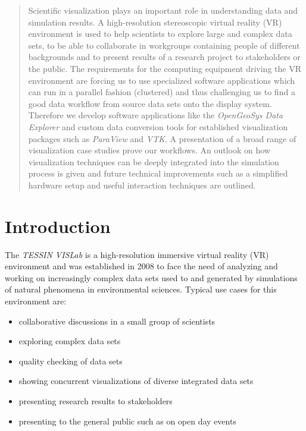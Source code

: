 \begin{abstract}
Scientific visualization plays an important role in understanding data
and simulation results. A high-resolution stereoscopic virtual reality
(VR) environment is used to help scientists to explore large and complex
data sets, to be able to collaborate in workgroups containing people of
different backgrounds and to present results of a research project to
stakeholders or the public. The requirements for the computing equipment
driving the VR environment are forcing us to use specialized
software applications which can run in a parallel fashion (clustered)
and thus challenging us to find a good data workflow from source data
sets onto the display system. Therefore we develop software applications
like the \emph{OpenGeoSys Data Explorer} and custom data conversion tools for
established visualization packages such as \emph{ParaView} and \emph{VTK}. A
presentation of a broad range of visualization case studies prove our
workflows. An outlook on how visualization techniques can be deeply
integrated into the simulation process is given and future technical
improvements such as a simplified hardware setup and useful interaction
techniques are outlined.
\end{abstract}


\section{Introduction}
\label{introduction}

The \emph{TESSIN VISLab} is a high-resolution immersive virtual reality (VR)
environment and was established in 2008 to face the need of analyzing
and working on increasingly complex data sets used to and generated by
simulations of natural phenomena in environmental sciences. Typical use
cases for this environment are:

\begin{itemize}
\itemsep1pt\parskip0pt
\item
  collaborative discussions in a small group of scientists
\item
  exploring complex data sets
\item
  quality checking of data sets
\item
  showing concurrent visualizations of diverse integrated data sets
\item
  presenting research results to stakeholders
\item
  presenting to the general public such as on open day events
\end{itemize}


